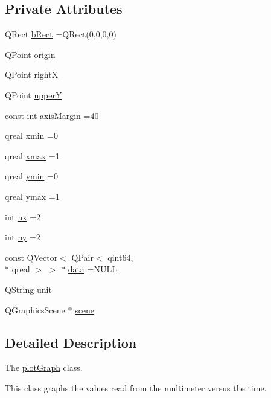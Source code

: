 \subsection*{Private Attributes}
\begin{DoxyCompactItemize}
\item 
Q\-Rect \hyperlink{classplot_graph_a82ade58d0ea960ec8c13bb3e0b084b8a}{b\-Rect} =Q\-Rect(0,0,0,0)
\item 
Q\-Point \hyperlink{classplot_graph_a1d47ee94eb0d3a2894723e4e12765d32}{origin}
\item 
Q\-Point \hyperlink{classplot_graph_a07f4680de55428eb49d593106414ccd9}{right\-X}
\item 
Q\-Point \hyperlink{classplot_graph_a32de5c2ff068bd201bc627eaf2d18322}{upper\-Y}
\item 
const int \hyperlink{classplot_graph_addb0f7d6a06ae97184b3013cccb6f456}{axis\-Margin} =40
\item 
qreal \hyperlink{classplot_graph_a45c23930851a6130acdc537755e467fa}{xmin} =0
\item 
qreal \hyperlink{classplot_graph_ac270a2ae2617fe5554eb99c9ae631f48}{xmax} =1
\item 
qreal \hyperlink{classplot_graph_a5746beef331fbadbf5e1a767b7ed7462}{ymin} =0
\item 
qreal \hyperlink{classplot_graph_a14556cbab64df6e06812a0578041956c}{ymax} =1
\item 
int \hyperlink{classplot_graph_adb0cd0f56da1aa52084da70231c92255}{nx} =2
\item 
int \hyperlink{classplot_graph_a1f6efb75c6de2d3da038666610df3aca}{ny} =2
\item 
const Q\-Vector$<$ Q\-Pair$<$ qint64, \\*
qreal $>$ $>$ $\ast$ \hyperlink{classplot_graph_af219b9987999a1b1c2b9af03a6cb93d1}{data} =N\-U\-L\-L
\item 
Q\-String \hyperlink{classplot_graph_a2e0df5fa1ed5f1448bae3d4404b1a6e5}{unit}
\item 
Q\-Graphics\-Scene $\ast$ \hyperlink{classplot_graph_ac35eabe1a0ffbb4379fedebe6d5057c3}{scene}
\end{DoxyCompactItemize}


\subsection{Detailed Description}
The \hyperlink{classplot_graph}{plot\-Graph} class. 

This class graphs the values read from the multimeter versus the time. 

